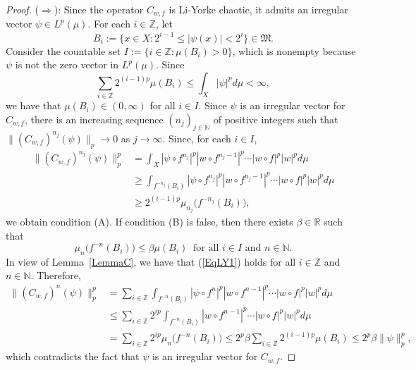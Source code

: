 \documentclass[12pt]{amsart}
\theoremstyle{theorem}
\theoremstyle{definition}
\theoremstyle{remark} \theoremstyle{question} \theoremstyle{example}
\newcommand{\N}{\mathbb{N}}
\newcommand{\Z}{\mathbb{Z}}
\newcommand{\R}{\mathbb{R}}
\newcommand{\fM}{\mathfrak{M}}
\begin{document}
\begin{proof}
\smallskip\noindent
($\Rightarrow$): Since the operator $C_{w,f}$ is Li-Yorke chaotic, it admits an irregular vector $\psi \in L^p(\mu)$. For each $i \in \Z$, let
\[
B_i\!:= \{x \in X : 2^{i-1} \leq |\psi(x)| < 2^i\} \in \fM.
\]
Consider the countable set $I\!:= \{i \in \Z : \mu(B_i) > 0\}$, which is nonempty because $\psi$ is not the zero vector in $L^p(\mu)$. 
Since 
\[
\sum_{i \in \Z} 2^{(i-1)p} \mu(B_i) \leq \int_X |\psi|^p d\mu < \infty,
\]
we have that $\mu(B_i) \in (0,\infty)$ for all  $i \in I$.
Since $\psi$ is an irregular vector for $C_{w,f}$, there is an increasing sequence $(n_j)_{j \in \N}$ of positive integers such that
$\|(C_{w,f})^{n_j}(\psi)\|_p \to 0$ as $j \to \infty$. Since, for each $i \in I$,
\begin{align*}
\|(C_{w,f})^{n_j}(\psi)\|_p^p &= \int_X |\psi \circ f^{n_j}|^p |w \circ f^{n_j-1}|^p \cdots |w \circ f|^p |w|^p d\mu\\
&\geq \int_{f^{-n_j}(B_i)} |\psi \circ f^{n_j}|^p |w \circ f^{n_j-1}|^p \cdots |w \circ f|^p |w|^p d\mu\\
&\geq 2^{(i-1)p} \mu_{n_j}\big(f^{-n_j}(B_i)\big),
\end{align*}
we obtain condition (A). If condition (B) is false, then there exists $\beta \in \R$ such that
\begin{equation}\label{EqLY1}
\mu_n\big(f^{-n}(B_i)\big) \leq \beta \mu(B_i) \ \text{ for all }  i \in I \text{ and } n \in \N.
\end{equation}
In view of Lemma~\ref{LemmaC}, we have that (\ref{EqLY1}) holds for all $i \in \Z$ and $n \in \N$. Therefore,
\begin{align*}
\|(C_{w,f})^n(\psi)\|_p^p 
&= \sum_{i \in \Z} \int_{f^{-n}(B_i)} |\psi \circ f^n|^p |w \circ f^{n-1}|^p \cdots |w \circ f|^p |w|^p d\mu\\
&\leq \sum_{i \in \Z} 2^{ip} \int_{f^{-n}(B_i)} |w \circ f^{n-1}|^p \cdots |w \circ f|^p |w|^p d\mu\\
&= \sum_{i \in \Z} 2^{ip} \mu_n\big(f^{-n}(B_i)\big)
\leq 2^p \beta \sum_{i \in \Z} 2^{(i-1)p} \mu(B_i)
\leq 2^p \beta \|\psi\|_p^p,
\end{align*}
which contradicts the fact that $\psi$ is an irregular vector for $C_{w,f}$.
\end{proof}
\end{document}
